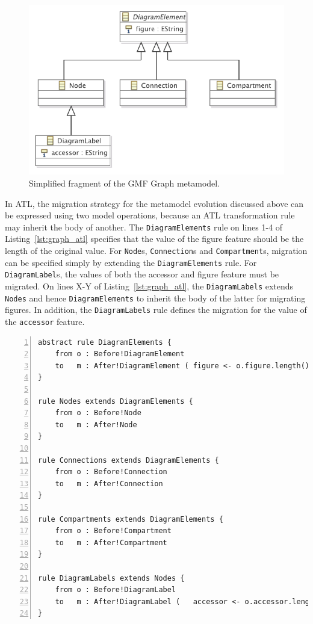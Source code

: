 \begin{figure}[htbp]
  \centering
  \includegraphics[scale=0.75]{6.Evaluation/images/subtyping.pdf}
  \caption{Simplified fragment of the GMF Graph metamodel.}
  \label{fig:subtyping}
\end{figure}

In ATL, the migration strategy for the metamodel evolution discussed above can be expressed using two model operations, because an ATL transformation rule may inherit the body of another. The \texttt{DiagramElements} rule on lines 1-4 of Listing~\ref{lst:graph_atl} specifies that the value of the figure feature should be the length of the original value. For \texttt{Node}s, \texttt{Connection}s and \texttt{Compartment}s, migration can be specified simply by extending the \texttt{DiagramElements} rule. For \texttt{DiagramLabel}s, the values of both the accessor and figure feature must be migrated. On lines X-Y of Listing~\ref{lst:graph_atl}, the \texttt{DiagramLabels} extends \texttt{Nodes} and hence \texttt{DiagramElements} to inherit the body of the latter for migrating figures. In addition, the \texttt{DiagramLabels} rule defines the migration for the value of the \texttt{accessor} feature.

\begin{lstlisting}[basicstyle=\ttfamily\footnotesize, flexiblecolumns=true, numbers=left, nolol=true, caption=Simplified GMF Graph model migration in ATL, label=lst:graph_atl, language=ATL, tabsize=2]
abstract rule DiagramElements {
	from o : Before!DiagramElement
	to   m : After!DiagramElement ( figure <- o.figure.length()	)
}

rule Nodes extends DiagramElements {
	from o : Before!Node
	to   m : After!Node
}

rule Connections extends DiagramElements {
	from o : Before!Connection
	to   m : After!Connection
}

rule Compartments extends DiagramElements {
	from o : Before!Compartment
	to   m : After!Compartment
}

rule DiagramLabels extends Nodes {
	from o : Before!DiagramLabel
	to   m : After!DiagramLabel (	accessor <- o.accessor.length()	)
}
\end{lstlisting}

